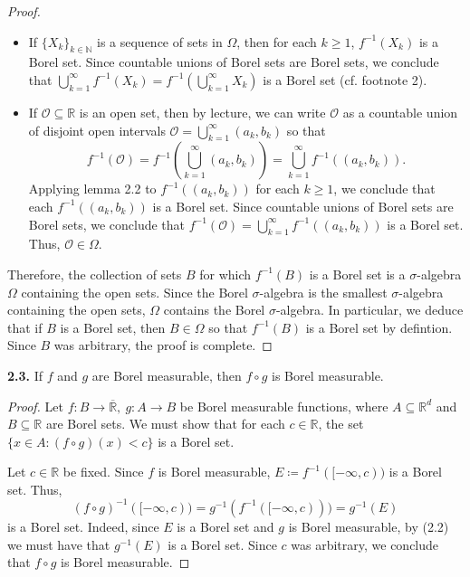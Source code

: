 \begin{proof}
\begin{itemize}
	\item If \( \{ X_k \}_{k \in \mathbb{N} }  \) is a sequence of sets in \( \Omega \), then for each \( k \geq 1 \), \( f^{-1}(X_k)  \) is a Borel set. Since countable unions of Borel sets are Borel sets, we conclude that \( \bigcup_{k=1}^{\infty} f^{-1}(X_k) = f^{-1}(\bigcup_{k=1}^{\infty} X_k)    \) is a Borel set (cf. footnote 2).
	\item If \( \mathcal{O} \subseteq \mathbb{R} \) is an open set, then by lecture, we can write \( \mathcal{O}  \) as a countable union of disjoint open intervals \( \mathcal{O} = \bigcup_{k=1}^{\infty} (a_k, b_k) \) so that \[f^{-1}(\mathcal{O} ) = f^{-1}\left ( {\bigcup_{k=1}^{\infty} (a_k, b_k)} \right )  = \bigcup_{k=1}^{\infty} f^{-1}((a_k, b_k)).\] Applying lemma 2.2 to \( f^{-1}((a_k, b_k))  \) for each \( k \geq 1 \), we conclude that each \( f^{-1}((a_k, b_k))  \) is a Borel set. Since countable unions of Borel sets are Borel sets, we conclude that \( f^{-1}(\mathcal{O} ) = \bigcup_{k=1}^{\infty} f^{-1}((a_k, b_k)) \) is a Borel set. Thus, \( \mathcal{O} \in \Omega\).
\end{itemize}
Therefore, the collection of sets \( B \) for which \( f^{-1}(B)  \) is a Borel set is a \(\sigma\)-algebra $\Omega$ containing the open sets. Since the Borel \(\sigma\)-algebra is the smallest \(\sigma\)-algebra containing the open sets, $\Omega$ contains the Borel \(\sigma\)-algebra. In particular, we deduce that if \( B \) is a Borel set, then \( B \in \Omega \) so that \( f^{-1}(B)  \) is a Borel set by defintion. Since \( B \) was arbitrary, the proof is complete.
\end{proof}

\noindent \textbf{2.3.} If \( f \) and \( g \) are Borel measurable, then \( f \circ g \) is Borel measurable.
\begin{proof}
Let \( f : B \to \overline{\mathbb{R}}, \ g : A \to B \) be Borel measurable functions, where \( A \subseteq \mathbb{R}^{d}  \) and \( B \subseteq \mathbb{R} \) are Borel sets. We must show that for each \( c \in \mathbb{R} \), the set \( \{ x \in A : (f \circ g) (x) < c \}  \) is a Borel set.

Let \( c \in \mathbb{R} \) be fixed. Since \( f \) is Borel measurable, \(E \coloneqq f^{-1}([-\infty, c))  \) is a Borel set. Thus, \[ (f\circ g)^{-1} ([-\infty, c))  =  g^{-1}(f^{-1}([-\infty,c)) ) = g^{-1}(E)  \] is a Borel set. Indeed, since \( E \) is a Borel set and \( g \) is Borel measurable, by (2.2) we must have that \( g^{-1}(E)  \) is a Borel set. Since \( c \) was arbitrary, we conclude that \( f \circ g \) is Borel measurable.
\end{proof}

